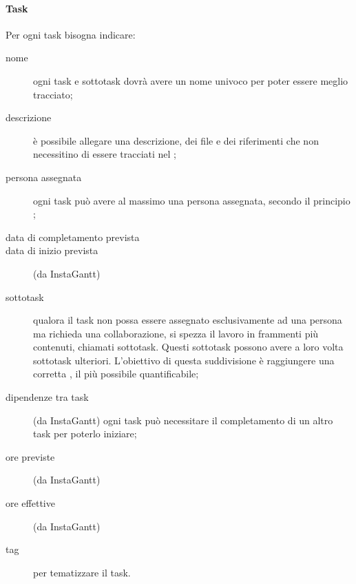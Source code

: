 		\paragraph{Task} Per ogni task bisogna indicare:
			\begin{description}
				\item[nome] ogni task e sottotask dovrà avere un nome univoco per poter essere meglio tracciato;
				\item[descrizione] è possibile allegare una descrizione, dei file e dei riferimenti che non necessitino di essere tracciati nel ;
				\item[persona assegnata] ogni task può avere al massimo una persona assegnata, secondo il principio ; %
				\item[data di completamento prevista]
				\item[data di inizio prevista] (da InstaGantt)
				\item[sottotask] qualora il task non possa essere assegnato esclusivamente ad una persona ma richieda una collaborazione, si spezza il lavoro in frammenti più contenuti, chiamati sottotask. Questi sottotask possono avere a loro volta sottotask ulteriori. L'obiettivo di questa suddivisione è raggiungere una corretta , il più possibile quantificabile;
				\item[dipendenze tra task] (da InstaGantt) ogni task può necessitare il completamento di un altro task per poterlo iniziare;
				\item[ore previste] (da InstaGantt)
				\item[ore effettive] (da InstaGantt)
				\item[tag] per tematizzare il task.
			\end{description}

